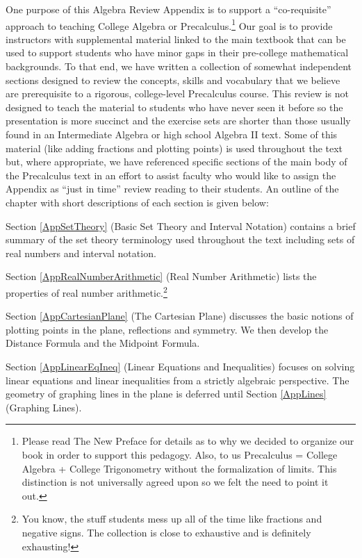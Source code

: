 One purpose of this Algebra Review Appendix is to support a ``co-requisite'' approach to teaching College Algebra or Precalculus.\footnote{Please read The New Preface for details as to why we decided to organize our book in order to support this pedagogy. Also, to us Precalculus = College Algebra + College Trigonometry without the formalization of limits.  This distinction is not universally agreed upon so we felt the need to point it out.}  Our goal is to provide instructors with supplemental material linked to the main textbook that can be used to support students who have minor gaps in their pre-college mathematical backgrounds.  To that end, we have written a collection of somewhat independent sections designed to review the concepts, skills and vocabulary that we believe are prerequisite to a rigorous, college-level Precalculus course.  This review is not designed to teach the material to students who have never seen it before so the presentation is more succinct and the exercise sets are shorter than those usually found in an Intermediate Algebra or high school Algebra II text.  Some of this material (like adding fractions and plotting points) is used throughout the text but, where appropriate, we have referenced specific sections of the main body of the Precalculus text in an effort to assist faculty who would like to assign the Appendix as ``just in time'' review reading to their students.  An outline of the chapter with short descriptions of each section is given below:

Section \ref{AppSetTheory} (Basic Set Theory and Interval Notation) contains a brief summary of the set theory terminology used throughout the text including sets of real numbers and interval notation.

Section \ref{AppRealNumberArithmetic} (Real Number Arithmetic) lists the properties of real number arithmetic.\footnote{You know, the stuff students mess up all of the time like fractions and negative signs.  The collection is close to exhaustive and is definitely exhausting!}

Section \ref{AppCartesianPlane} (The Cartesian Plane) discusses the basic notions of plotting points in the plane, reflections and symmetry.  We then develop the Distance Formula and the Midpoint Formula.

Section \ref{AppLinearEqIneq} (Linear Equations and Inequalities) focuses on solving linear equations and linear inequalities from a strictly algebraic perspective.  The geometry of graphing lines in the plane is deferred until Section \ref{AppLines} (Graphing Lines).

